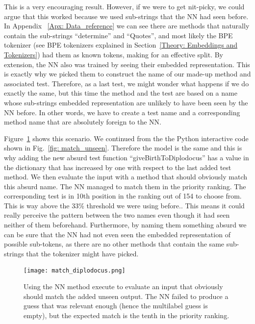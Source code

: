 \documentclass[a4paper, 11pt]{report}
\begin{document}
    This is a very encouraging result. However, if we were to get nit-picky, we could argue that this worked because we used sub-strings that the NN had seen before. In Appendix ~\ref{Apx: Data_reference} we can see there are methods that naturally contain the sub-strings ``determine'' and ``Quotes'', and most likely the BPE tokenizer (see BPE tokenizers explained in Section~\ref{Theory: Embeddings and Tokenizers}) had them as known tokens, making for an effective split. By extension, the NN also was trained by seeing their embedded representation. This is exactly why we picked them to construct the name of our made-up method and associated test. Therefore, as a last test, we might wonder what happens if we do exactly the same, but this time the method and the test are based on a name whose sub-strings embedded representation are unlikely to have been seen by the NN before. In other words, we have to create a test name and a corresponding method name that are absolutely foreign to the NN.

    Figure~\ref{fig: diplodocus} shows this scenario. We continued from the the Python interactive code shown in Fig.~\ref{fig: match_unseen}. Therefore the model is the same and this is why adding the new absurd test function ``giveBirthToDiplodocus'' has a value in the dictionary that has increased by one with respect to the last added test method. We then evaluate the input with a method that should obviously match this absurd name. The NN managed to match them in the priority ranking. The corresponding test is in 10th position in the ranking out of 154 to choose from. This is way above the 33\% threshold we were using before.. This means it could really perceive the pattern between the two names even though it had seen neither of them beforehand. Furthermore, by naming them something absurd we can be sure that the NN had not even seen the embedded representation of possible sub-tokens, as there are no other methods that contain the same sub-strings that the tokenizer might have picked.

    \begin{figure}[ht!]
        \centering
        \texttt{[image: match\_diplodocus.png]}
        \caption[Matching an absurd name]{Using the NN method execute to evaluate an input that obviously should match the added unseen output. The NN failed to produce a guess that was relevant enough (hence the multilabel guess is empty), but the expected match is the tenth in the priority ranking.}
        \label{fig: diplodocus}
    \end{figure}
\end{document}
